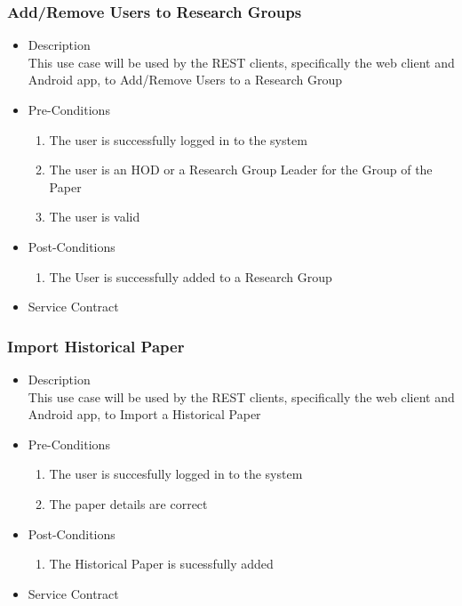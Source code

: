 \documentclass[a4paper,10pt]{article}
\begin{document}
\subsubsection{Add/Remove Users to Research Groups}
	\begin{itemize}
		\item Description\\
			This use case will be used by the REST clients, specifically the web client and Android app, to Add/Remove Users to a  Research Group
		\item Pre-Conditions
			\begin{enumerate}
				\item The user is successfully logged in to the system
				\item The user is an HOD or a Research Group Leader for the Group of the Paper
				\item The user is valid
			\end{enumerate}
		\item Post-Conditions
			\begin{enumerate}
				\item The User is successfully added to a Research Group
						
			\end{enumerate}
		\item Service Contract
	\end{itemize}

\subsubsection{Import Historical Paper}
	\begin{itemize}
		\item Description\\
			This use case will be used by the REST clients, specifically the web client and Android app, to Import a Historical Paper
		\item Pre-Conditions
			\begin{enumerate}
				\item The user is succesfully logged in to the system
				\item The paper details are correct
			\end{enumerate}
		\item Post-Conditions
			\begin{enumerate}
				\item The Historical Paper is sucessfully added
						
			\end{enumerate}
		\item Service Contract
	\end{itemize}
\end{document}

